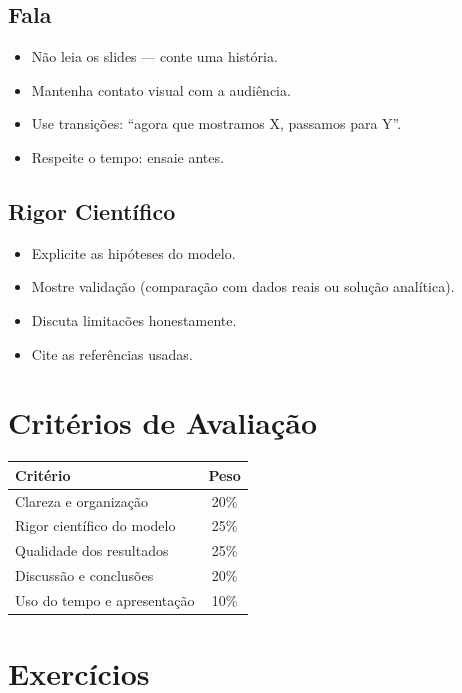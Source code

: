 \documentclass[12pt,a4paper]{article}
\begin{document}
\subsection*{Fala}
\begin{itemize}
  \item N\~ao leia os slides --- conte uma hist\'oria.
  \item Mantenha contato visual com a audi\^encia.
  \item Use transi\c{c}\~oes: ``agora que mostramos X, passamos para Y''.
  \item Respeite o tempo: ensaie antes.
\end{itemize}

\subsection*{Rigor Cient\'ifico}
\begin{itemize}
  \item Explicite as hip\'oteses do modelo.
  \item Mostre valida\c{c}\~ao (compara\c{c}\~ao com dados reais ou solu\c{c}\~ao anal\'itica).
  \item Discuta limitac\~oes honestamente.
  \item Cite as refer\^encias usadas.
\end{itemize}

\section*{Crit\'erios de Avalia\c{c}\~ao}

\begin{tabular}{|l|c|}
\hline
\textbf{Crit\'erio} & \textbf{Peso} \\
\hline
Clareza e organiza\c{c}\~ao & 20\% \\
Rigor cient\'ifico do modelo & 25\% \\
Qualidade dos resultados & 25\% \\
Discuss\~ao e conclus\~oes & 20\% \\
Uso do tempo e apresenta\c{c}\~ao & 10\% \\
\hline
\end{tabular}

\section*{Exerc\'icios}
\end{document}
